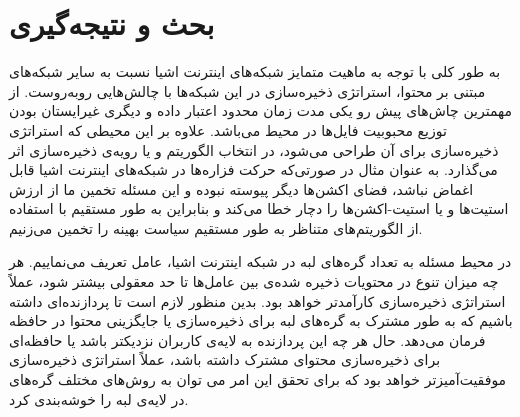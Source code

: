 \chapter{بحث و نتیجه‌گیری}
به طور کلی با توجه به ماهیت متمایز شبکه‌های اینترنت اشیا نسبت به سایر شبکه‌های مبتنی بر محتوا، استراتژی ذخیره‌سازی در این شبکه‌ها با چالش‌هایی روبه‌روست. از مهمترین چاش‌های پیش رو یکی مدت زمان محدود اعتبار داده و دیگری غیرایستان بودن توزیع محبوبیت فایل‌ها در محیط می‌باشد. علاوه بر این محیطی که استراتژی ذخیره‌سازی برای آن طراحی ‌می‌شود، در انتخاب الگوریتم و یا رویه‌ی ذخیره‌سازی اثر می‌گذارد. به عنوان مثال در صورتی‌که حرکت فزاره‌ها در شبکه‌های اینترنت اشیا قابل اغماض نباشد، فضای اکشن‌ها دیگر پیوسته نبوده و این مسئله تخمین ما از ارزش استیت‌ها و یا استیت-اکشن‌ها را دچار خطا می‌کند و بنابراین به طور مستقیم با استفاده از الگوریتم‌های متناظر به طور مستقیم سیاست بهینه را تخمین می‌زنیم. 

در محیط مسئله به تعداد گره‌های لبه در شبکه اینترنت اشیا، عامل تعریف می‌نماییم. هر چه میزان تنوع در محتویات ذخیره شده‌ی بین عامل‌ها تا حد معقولی بیشتر شود، عملاً استراتژی ذخیره‌سازی کارآمدتر خواهد بود. بدین منظور لازم است تا پردازنده‌ای داشته باشیم که به طور مشترک به گره‌های لبه برای ذخیره‌سازی یا جایگزینی محتوا در حافظه فرمان می‌دهد. حال هر چه این پردازنده به لایه‌ی کاربران نزدیکتر باشد یا حافظه‌ای برای ذخیره‌سازی محتوای مشترک داشته باشد،‌ عملاً استراتژی ذخیره‌سازی موفقیت‌آمیزتر خواهد بود که برای تحقق این امر می توان به روش‌های مختلف گره‌های در لایه‌ی لبه را خوشه‌بندی کرد.